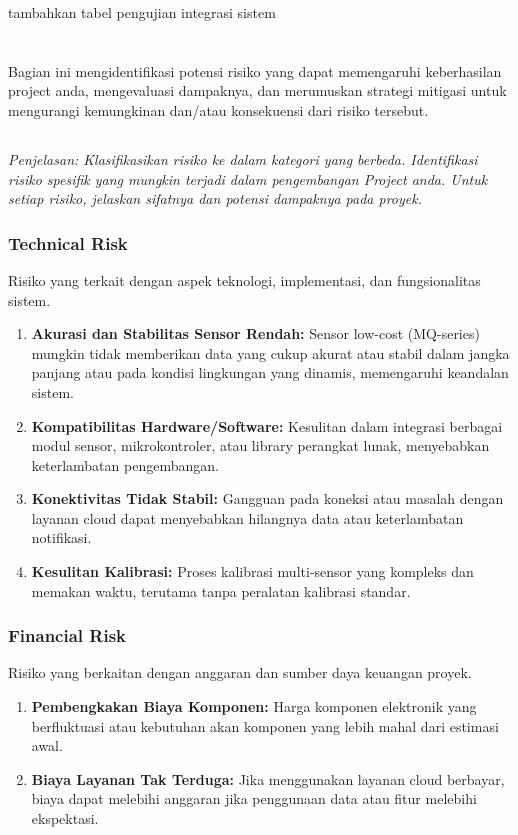 \documentclass{elsinta}
\begin{document}
 tambahkan tabel pengujian integrasi sistem
 
\section{\RiskAssessmentTitle}

Bagian ini mengidentifikasi potensi risiko yang dapat memengaruhi keberhasilan project anda, mengevaluasi dampaknya, dan merumuskan strategi mitigasi untuk mengurangi kemungkinan dan/atau konsekuensi dari risiko tersebut.

\subsection{\TechFinancialRiskTitle}
\textit{Penjelasan: Klasifikasikan risiko ke dalam kategori yang berbeda. Identifikasi risiko spesifik yang mungkin terjadi dalam pengembangan Project anda. Untuk setiap risiko, jelaskan sifatnya dan potensi dampaknya pada proyek.}

\subsubsection*{Technical Risk}
Risiko yang terkait dengan aspek teknologi, implementasi, dan fungsionalitas sistem.
\begin{enumerate}
    \item \textbf{Akurasi dan Stabilitas Sensor Rendah:} Sensor low-cost ($\text{MQ}$-series) mungkin tidak memberikan data yang cukup akurat atau stabil dalam jangka panjang atau pada kondisi lingkungan yang dinamis, memengaruhi keandalan sistem.
    \item \textbf{Kompatibilitas Hardware/Software:} Kesulitan dalam integrasi berbagai modul sensor, mikrokontroler, atau library perangkat lunak, menyebabkan keterlambatan pengembangan.
    \item \textbf{Konektivitas  Tidak Stabil:} Gangguan pada koneksi  atau masalah dengan layanan cloud dapat menyebabkan hilangnya data atau keterlambatan notifikasi.
    \item \textbf{Kesulitan Kalibrasi:} Proses kalibrasi multi-sensor yang kompleks dan memakan waktu, terutama tanpa peralatan kalibrasi standar.
\end{enumerate}

\subsubsection*{Financial Risk}
Risiko yang berkaitan dengan anggaran dan sumber daya keuangan proyek.
\begin{enumerate}
    \item \textbf{Pembengkakan Biaya Komponen:} Harga komponen elektronik yang berfluktuasi atau kebutuhan akan komponen yang lebih mahal dari estimasi awal.
    \item \textbf{Biaya Layanan  Tak Terduga:} Jika menggunakan layanan cloud berbayar, biaya dapat melebihi anggaran jika penggunaan data atau fitur melebihi ekspektasi.
\end{enumerate}
\end{document}
